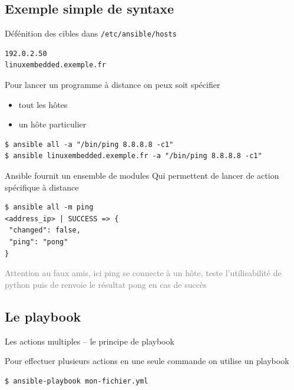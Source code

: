 \documentclass[compress]{smilebeamer}
\begin{document}
\subsection{Exemple simple de syntaxe}

\begin{frame}[fragile]
Défénition des cibles dans \texttt{/etc/ansible/hosts}
\begin{lstlisting}
192.0.2.50
linuxembedded.exemple.fr
\end{lstlisting}
\end{frame}

\begin{frame}[fragile]
Pour lancer un programme à distance on peux soit spécifier
\begin{itemize}
	\item tout les hôtes
	\item un hôte particulier
\end{itemize}
\begin{lstlisting}[style=shell]
$ ansible all -a "/bin/ping 8.8.8.8 -c1"
$ ansible linuxembedded.exemple.fr -a "/bin/ping 8.8.8.8 -c1"
\end{lstlisting}
\end{frame}

\begin{frame}[fragile]
Ansible fournit un ensemble de modules\newline
Qui permettent de lancer de action spécifique à distance
\begin{lstlisting}[style=shell]
$ ansible all -m ping
<address_ip> | SUCCESS => {
 "changed": false, 
 "ping": "pong"
}
\end{lstlisting}
\textcolor{gray}{\tiny{Attention au faux amis, ici ping se connecte à un hôte, teste l’utilisabilité de python puis de renvoie le résultat pong en cas de succès}}
\end{frame}

\subsection{Le playbook}

\begin{frame}
\begin{center}
\huge{Les actions multiples – le principe de playbook}
\end{center}
\end{frame}

\begin{frame}[fragile]
Pour effectuer plusieurs actions en une seule commande on utilise un playbook
\begin{lstlisting}[style=shell]
$ ansible-playbook mon-fichier.yml
\end{lstlisting}
\end{frame}
\end{document}
